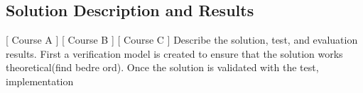 \subsection{Solution Description and Results}
[ Course A ] [ Course B ] [ Course C ] 
\newline
Describe the solution, test, and evaluation results.
First a verification model is created to ensure that the solution works theoretical(find bedre ord). Once the solution is validated with the test, implementation 